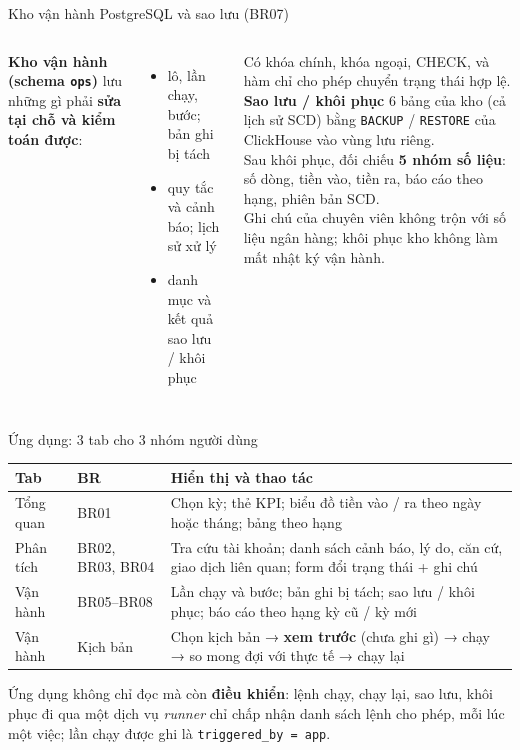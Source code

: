 \documentclass[aspectratio=169,11pt]{beamer}
\newcommand{\tbl}[1]{\texttt{#1}}
\begin{document}
\begin{frame}{Kho vận hành PostgreSQL và sao lưu (BR07)}
  \begin{columns}[T]
    \small
    \textbf{Kho vận hành (schema \tbl{ops})} lưu những gì phải \textbf{sửa tại chỗ và kiểm toán được}:
    \begin{itemize}
      \item lô, lần chạy, bước; bản ghi bị tách
      \item quy tắc và cảnh báo; lịch sử xử lý
      \item danh mục và kết quả sao lưu / khôi phục
    \end{itemize}
    Có khóa chính, khóa ngoại, CHECK, và hàm chỉ cho phép chuyển trạng thái hợp lệ.
    \small
    \textbf{Sao lưu / khôi phục} 6 bảng của kho (cả lịch sử SCD) bằng \tbl{BACKUP} / \tbl{RESTORE} của ClickHouse vào vùng lưu riêng.\\[4pt]
    Sau khôi phục, đối chiếu \textbf{5 nhóm số liệu}: số dòng, tiền vào, tiền ra, báo cáo theo hạng, phiên bản SCD.\\[4pt]
    \footnotesize Ghi chú của chuyên viên không trộn với số liệu ngân hàng; khôi phục kho không làm mất nhật ký vận hành.
  \end{columns}
\end{frame}

\begin{frame}{Ứng dụng: 3 tab cho 3 nhóm người dùng}
  \footnotesize
  \begin{tabular}{L{1.7cm} L{2.1cm} L{8.8cm}}
    \toprule
    \textbf{Tab} & \textbf{BR} & \textbf{Hiển thị và thao tác} \\
    \midrule
    Tổng quan & BR01 & Chọn kỳ; thẻ KPI; biểu đồ tiền vào / ra theo ngày hoặc tháng; bảng theo hạng \\
    Phân tích & BR02, BR03, BR04 & Tra cứu tài khoản; danh sách cảnh báo, lý do, căn cứ, giao dịch liên quan; form đổi trạng thái + ghi chú \\
    Vận hành & BR05--BR08 & Lần chạy và bước; bản ghi bị tách; sao lưu / khôi phục; báo cáo theo hạng kỳ cũ / kỳ mới \\
    Vận hành & Kịch bản & Chọn kịch bản → \textbf{xem trước} (chưa ghi gì) → chạy → so mong đợi với thực tế → chạy lại \\
    \bottomrule
  \end{tabular}
  \bigskip

  \small Ứng dụng không chỉ đọc mà còn \textbf{điều khiển}: lệnh chạy, chạy lại, sao lưu, khôi phục đi qua một dịch vụ \emph{runner} chỉ chấp nhận danh sách lệnh cho phép, mỗi lúc một việc; lần chạy được ghi là \tbl{triggered\_by = app}.
\end{frame}
\end{document}
